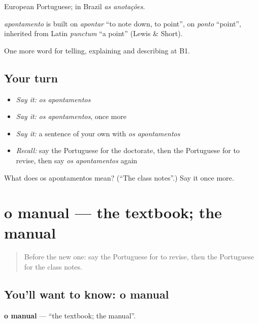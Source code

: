 European Portuguese; in Brazil \emph{as anotações}.

\begin{cousinweb}
\emph{apontamento} is built on \emph{apontar} \textquotedblleft{}to note down, to point\textquotedblright{}, on \emph{ponto} \textquotedblleft{}point\textquotedblright{}, inherited from Latin \emph{punctum} \textquotedblleft{}a point\textquotedblright{} (Lewis \& Short).
\end{cousinweb}

\begin{grammarlens}[title={What you've built}]
One more word for telling, explaining and describing at B1.
\end{grammarlens}

\subsection*{Your turn}
\begin{itemize}
\raggedright
  \item \emph{Say it:} \emph{os apontamentos}
  \item \emph{Say it:} \emph{os apontamentos}, once more
  \item \emph{Say it:} a sentence of your own with \emph{os apontamentos}
  \item \emph{Recall:} say the Portuguese for the doctorate, then the Portuguese for to revise, then say \emph{os apontamentos} again
\end{itemize}

\begin{tcolorbox}[breakable,colback=teal!4,colframe=teal!35!black,title={Before you move on}]
What does os apontamentos mean? (\textquotedblleft{}The class notes\textquotedblright{}.) Say it once more.
\end{tcolorbox}
\section[o manual]{o manual — the textbook; the manual}

\label{lesson:PT-C378-manual}



\begin{quote}
Before the new one: say the Portuguese for to revise, then the Portuguese for the class notes.
\end{quote}

\subsection*{You'll want to know: o manual}
\textbf{o manual} — \textquotedblleft{}the textbook; the manual\textquotedblright{}.

